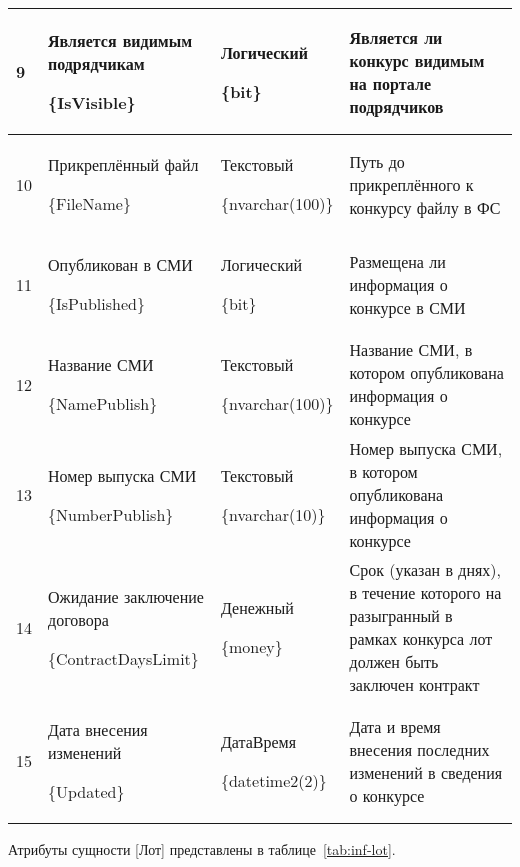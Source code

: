 \begin{footnotesize}
\begin{longtable}[h]{|p{}|p{}|p{}|p{}|}
	9 & Является видимым подрядчикам \par \{IsVisible\} & Логический \par \{bit\} & Является ли конкурс видимым на портале подрядчиков \\ \hline
	10 & Прикреплённый файл \par \{FileName\} & Текстовый \par \{nvarchar(100)\} & Путь до прикреплённого к конкурсу файлу в ФС \\ \hline
	11 & Опубликован в СМИ \par \{IsPublished\} & Логический \par \{bit\} & Размещена ли информация о конкурсе в СМИ \\ \hline
	12 & Название СМИ \par \{NamePublish\} & Текстовый \par \{nvarchar(100)\} & Название СМИ, в котором опубликована информация о конкурсе \\ \hline
	13 & Номер выпуска СМИ \par \{NumberPublish\} & Текстовый \par \{nvarchar(10)\} & Номер выпуска СМИ, в котором опубликована информация о конкурсе \\ \hline
	14 & Ожидание заключение договора \par \{ContractDaysLimit\} & Денежный \par \{money\} & Срок (указан в днях), в течение которого на разыгранный в рамках конкурса лот должен быть заключен контракт \\ \hline
	15 & Дата внесения изменений \par \{Updated\} & ДатаВремя \par \{datetime2(2)\} & Дата и время внесения последних изменений в сведения о конкурсе \\ \hline
\end{longtable}
\end{footnotesize}

Атрибуты сущности [Лот] представлены в таблице~\ref{tab:inf-lot}.

